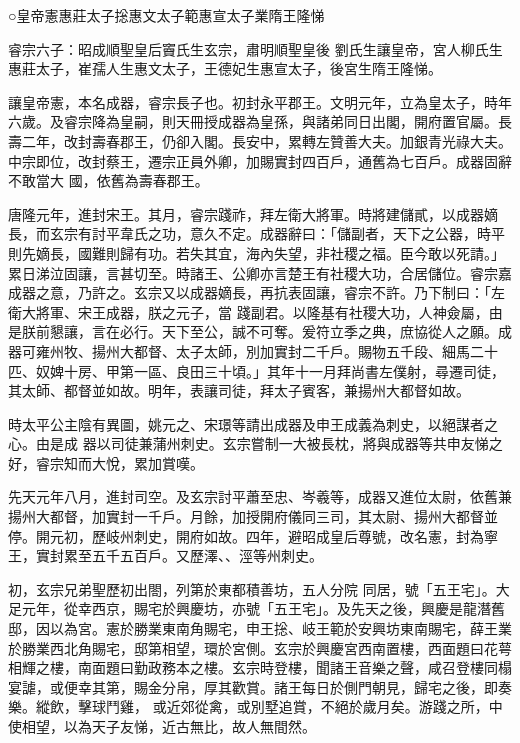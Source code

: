 
\begin{pinyinscope}

 ○皇帝憲惠莊太子捴惠文太子範惠宣太子業隋王隆悌



 睿宗六子：昭成順聖皇后竇氏生玄宗，肅明順聖皇後
 劉氏生讓皇帝，宮人柳氏生惠莊太子，崔孺人生惠文太子，王德妃生惠宣太子，後宮生隋王隆悌。



 讓皇帝憲，本名成器，睿宗長子也。初封永平郡王。文明元年，立為皇太子，時年六歲。及睿宗降為皇嗣，則天冊授成器為皇孫，與諸弟同日出閣，開府置官屬。長壽二年，改封壽春郡王，仍卻入閣。長安中，累轉左贊善大夫。加銀青光祿大夫。中宗即位，改封蔡王，遷宗正員外卿，加賜實封四百戶，通舊為七百戶。成器固辭不敢當大
 國，依舊為壽春郡王。



 唐隆元年，進封宋王。其月，睿宗踐祚，拜左衛大將軍。時將建儲貳，以成器嫡長，而玄宗有討平韋氏之功，意久不定。成器辭曰：「儲副者，天下之公器，時平則先嫡長，國難則歸有功。若失其宜，海內失望，非社稷之福。臣今敢以死請。」累日涕泣固讓，言甚切至。時諸王、公卿亦言楚王有社稷大功，合居儲位。睿宗嘉成器之意，乃許之。玄宗又以成器嫡長，再抗表固讓，睿宗不許。乃下制曰：「左衛大將軍、宋王成器，朕之元子，當
 踐副君。以隆基有社稷大功，人神僉屬，由是朕前懇讓，言在必行。天下至公，誠不可奪。爰符立季之典，庶協從人之願。成器可雍州牧、揚州大都督、太子太師，別加實封二千戶。賜物五千段、細馬二十匹、奴婢十房、甲第一區、良田三十頃。」其年十一月拜尚書左僕射，尋遷司徒，其太師、都督並如故。明年，表讓司徒，拜太子賓客，兼揚州大都督如故。



 時太平公主陰有異圖，姚元之、宋璟等請出成器及申王成義為刺史，以絕謀者之心。由是成
 器以司徒兼蒲州刺史。玄宗嘗制一大被長枕，將與成器等共申友悌之好，睿宗知而大悅，累加賞嘆。



 先天元年八月，進封司空。及玄宗討平蕭至忠、岑羲等，成器又進位太尉，依舊兼揚州大都督，加實封一千戶。月餘，加授開府儀同三司，其太尉、揚州大都督並停。開元初，歷岐州刺史，開府如故。四年，避昭成皇后尊號，改名憲，封為寧王，實封累至五千五百戶。又歷澤、、涇等州刺史。



 初，玄宗兄弟聖歷初出閤，列第於東都積善坊，五人分院
 同居，號「五王宅」。大足元年，從幸西京，賜宅於興慶坊，亦號「五王宅」。及先天之後，興慶是龍潛舊邸，因以為宮。憲於勝業東南角賜宅，申王捴、岐王範於安興坊東南賜宅，薛王業於勝業西北角賜宅，邸第相望，環於宮側。玄宗於興慶宮西南置樓，西面題曰花萼相輝之樓，南面題曰勤政務本之樓。玄宗時登樓，聞諸王音樂之聲，咸召登樓同榻宴謔，或便幸其第，賜金分帛，厚其歡賞。諸王每日於側門朝見，歸宅之後，即奏樂。縱飲，擊球鬥雞，
 或近郊從禽，或別墅追賞，不絕於歲月矣。游踐之所，中使相望，以為天子友悌，近古無比，故人無間然。




\end{pinyinscope}
